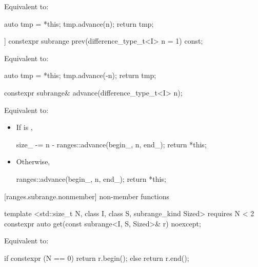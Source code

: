 \begin{addedblock}
\begin{itemdescr}
\pnum
\effects Equivalent to:
\begin{codeblock}
auto tmp = *this;
tmp.advance(n);
return tmp;
\end{codeblock}
\end{itemdescr}

%
\begin{itemdecl}
[[nodiscard]] constexpr subrange prev(difference_type_t<I> n = 1) const;
\end{itemdecl}

\begin{itemdescr}
\pnum
\effects Equivalent to:
\begin{codeblock}
auto tmp = *this;
tmp.advance(-n);
return tmp;
\end{codeblock}
\end{itemdescr}

%
\begin{itemdecl}
constexpr subrange& advance(difference_type_t<I> n);
\end{itemdecl}

\begin{itemdescr}
\pnum
\effects Equivalent to:
\begin{itemize}
\item If  is ,
\begin{codeblock}
size_ -= n - ranges::advance(begin_, n, end_);
return *this;
\end{codeblock}
\item Otherwise,
\begin{codeblock}
ranges::advance(begin_, n, end_);
return *this;
\end{codeblock}
\end{itemize}
\end{itemdescr}

[ranges.subrange.nonmember]{ non-member functions}

%
\begin{itemdecl}
template <std::size_t N, class I, class S, subrange_kind Sized>
  requires N < 2
constexpr auto get(const subrange<I, S, Sized>& r) noexcept;
\end{itemdecl}

\begin{itemdescr}
\pnum
\effects Equivalent to:
\begin{codeblock}
if constexpr (N == 0)
  return r.begin();
else
  return r.end();
\end{codeblock}
\end{itemdescr}
\end{addedblock}

